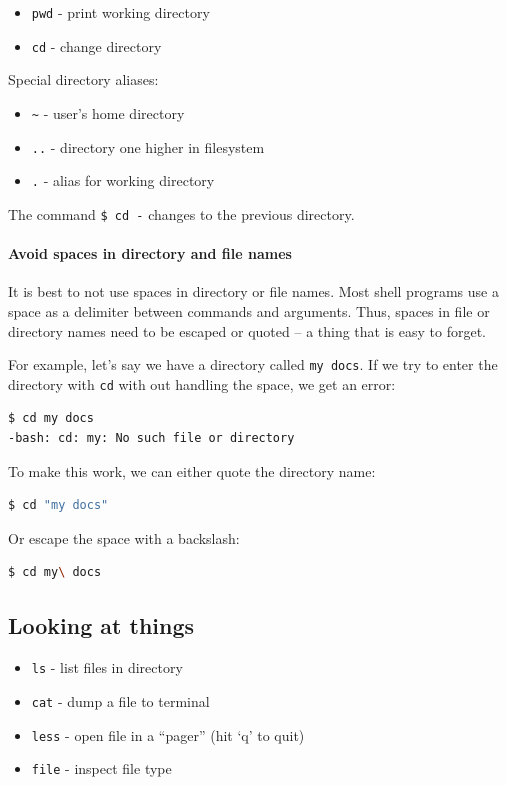\documentclass[12pt,letterpaper,twoside]{article}
\begin{document}
\begin{itemize}
\item \texttt{pwd} - print working directory
\item \texttt{cd} - change directory
\end{itemize}

Special directory aliases:

\begin{itemize}
\item \texttt{\~} - user's home directory
\item \texttt{..} - directory one higher in filesystem
\item \texttt{.} - alias for working directory
\end{itemize}

The command \texttt{\$ cd -} changes to the previous directory.

\paragraph{Avoid spaces in directory and file names} 
It is best to not use spaces in directory or file names.  Most shell programs
use a space as a delimiter between commands and arguments.  Thus, spaces in file
or directory names need to be escaped or quoted -- a thing that is easy to
forget.

For example, let's say we have a directory called \texttt{my docs}.  If we try to
enter the directory with \texttt{cd} with out handling the space, we get an error:

\begin{lstlisting}[language=bash]
$ cd my docs
-bash: cd: my: No such file or directory
\end{lstlisting}

To make this work, we can either quote the directory name:

\begin{lstlisting}[language=bash]
$ cd "my docs"
\end{lstlisting}

Or escape the space with a backslash:

\begin{lstlisting}[language=bash]
$ cd my\ docs
\end{lstlisting}

\subsection{Looking at things}
\begin{itemize}
\item \texttt{ls} - list files in directory
\item \texttt{cat} - dump a file to terminal
\item \texttt{less} - open file in a ``pager'' (hit `q' to quit)
\item \texttt{file} - inspect file type
\end{itemize}
\end{document}
